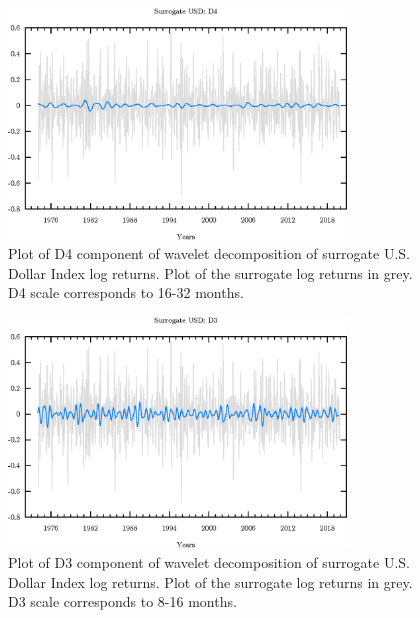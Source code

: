 \begin{figure}
\begin{center}
\includegraphics[width=0.8\textwidth]{./code/plot/surrogate_usd_wr_D4.eps}
\caption{Plot of D4 component of wavelet decomposition of surrogate U.S. Dollar Index log returns. 
	Plot of the surrogate log returns in grey. D4 scale corresponds to 16-32 months.}
\end{center}
\label{fig:s-usd-wr-d4}
\end{figure}

\begin{figure}
\begin{center}
\includegraphics[width=0.8\textwidth]{./code/plot/surrogate_usd_wr_D3.eps}
\caption{Plot of D3 component of wavelet decomposition of surrogate U.S. Dollar Index log returns. 
	Plot of the surrogate log returns in grey. D3 scale corresponds to 8-16 months.}
\end{center}
\label{fig:s-usd-wr-d3}
\end{figure}

